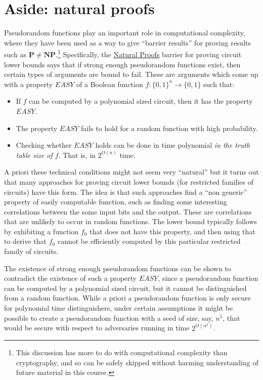 \section{Aside: natural proofs}\label{Aside-natural-proofs}

Pseudorandom functions play an important role in computational
complexity, where they have been used as a way to give ``barrier
results'' for proving results such as
\(\mathbf{P}\neq \mathbf{NP}\).\footnote{This discussion has more to do
  with computational complexity than cryptography, and so can be safely
  skipped without harming understanding of future material in this
  course.} Specifically, the \href{https://goo.gl/fiH3Pe}{Natural
Proofs} barrier for proving circuit lower bounds says that if strong
enough pseudorandom functions exist, then certain types of arguments are
bound to fail. These are arguments which come up with a property
\(\ensuremath{\mathit{EASY}}\) of a Boolean function
\(f:\{0,1\}^n \rightarrow \{0,1\}\) such that:

\begin{itemize}
\item
  If \(f\) can be computed by a polynomial sized circuit, then it has
  the property \(\ensuremath{\mathit{EASY}}\).
\item
  The property \(\ensuremath{\mathit{EASY}}\) fails to hold for a random
  function with high probability.
\item
  Checking whether \(\ensuremath{\mathit{EASY}}\) holds can be done in
  time polynomial \emph{in the truth table size of \(f\)}. That is, in
  \(2^{O(n)}\) time.
\end{itemize}

A priori these technical conditions might not seem very ``natural'' but
it turns out that many approaches for proving circuit lower bounds (for
restricted families of circuits) have this form. The idea is that such
approaches find a ``non generic'' property of easily computable
function, such as finding some interesting correlations between the some
input bits and the output. These are correlations that are unlikely to
occur in random functions. The lower bound typically follows by
exhibiting a function \(f_0\) that does not have this property, and then
using that to derive that \(f_0\) cannot be efficiently computed by this
particular restricted family of circuits.

The existence of strong enough pseudorandom functions can be shown to
contradict the existence of such a property
\(\ensuremath{\mathit{EASY}}\), since a pseudorandom function can be
computed by a polynomial sized circuit, but it cannot be distinguished
from a random function. While a priori a pseudorandom function is only
secure for polynomial time distinguishers, under certain assumptions it
might be possible to create a pseudorandom function with a seed of size,
say, \(n^5\), that would be secure with respect to adversaries running
in time \(2^{O(n^2)}\).
